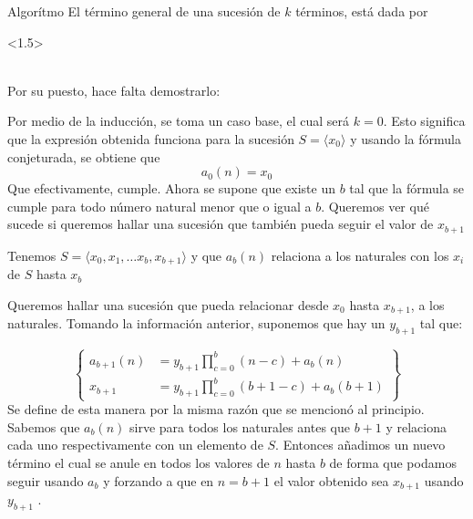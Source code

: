 \begin{proofbox}[10]{Algorítmo}
    El término general de una sucesión de $k$ términos, está dada por
    \begin{center}
        \begin{derivation}<1.5>
                \\
            \\
        \end{derivation}
    \end{center}
    Por su puesto, hace falta demostrarlo:
\end{proofbox}
\clearpage


Por medio de la inducción, se toma un caso base, el cual será $k=0$. Esto significa que la expresión obtenida funciona para la sucesión $S = \langle x_0\rangle$
y usando la fórmula conjeturada, se obtiene que
\[a_0(n) = x_0 \]
Que efectivamente, cumple.
Ahora se supone que existe un $b$ tal que la fórmula se cumple para todo número natural menor que o igual a $b$. Queremos ver qué sucede si queremos hallar una sucesión que también pueda seguir el valor de $x_{b+1}$

Tenemos $S = \langle x_0, x_1, \dots x_b, x_{b+1}\rangle$
y que $a_b(n)$ relaciona a los naturales con los $x_i$ de $S$ hasta $x_b$

Queremos hallar una sucesión que pueda relacionar desde $x_0$ hasta $x_{b+1}$, a los naturales. Tomando la información anterior, suponemos que hay un $y_{b+1}$ tal que:

\begin{equation*}
    \left\{
        \begin{aligned}
            a_{b+1}(n) &= y_{b+1} \displaystyle\prod_{c=0}^{b}(n-c) + a_b(n)\\
            x_{b+1} &= y_{b+1} \displaystyle\prod_{c=0}^{b}(b+1 - c) + a_b(b + 1)                
        \end{aligned}
    \right\}
\end{equation*}
Se define de esta manera por la misma razón que se mencionó al principio. Sabemos que $a_b(n)$ sirve para todos los naturales antes que $b+1$ y relaciona cada uno respectivamente con un elemento de $S$. Entonces añadimos un nuevo término el cual se anule en todos los valores de $n$ hasta $b$ de forma que podamos seguir usando $a_b$ y forzando a que en $n=b+1$ el valor obtenido sea $x_{b+1}$ usando $y_{b+1}$ .

